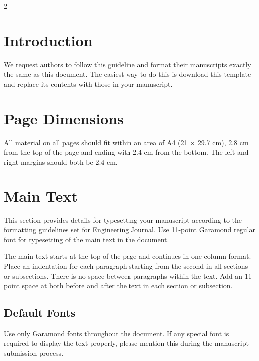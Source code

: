 \documentclass[11pt,a4paper]{article}
\begin{document}
\newpage



\pagestyle{fancy}
\fancyhead{}%
\fancyfoot{}%

\begin{multicols}{2}



\section{Introduction}
We request authors to follow this guideline and format their manuscripts exactly the same as this document. The easiest way to do this is download this template and replace its contents with those in your manuscript.


\section{Page Dimensions}
All material on all pages should fit within an area of A4 (21 $\times$ 29.7 cm), 2.8 cm from the top of the page and ending with 2.4 cm from the bottom. The left and right margins should both be 2.4 cm.

\section{Main Text}
This section provides details for typesetting your manuscript according to the formatting guidelines set for Engineering Journal. Use 11-point Garamond regular font for typesetting of the main text in the document.

The main text starts at the top of the page and continues in one column format. Place an indentation for each paragraph starting from the second in all sections or subsections. There is no space between paragraphs within the text. Add an 11-point space at both before and after the text in each section or subsection.

\subsection{Default Fonts}
Use only Garamond fonts throughout the document. If any special font is required to display the text properly, please mention this during the manuscript submission process.


\end{multicols}
\end{document}
